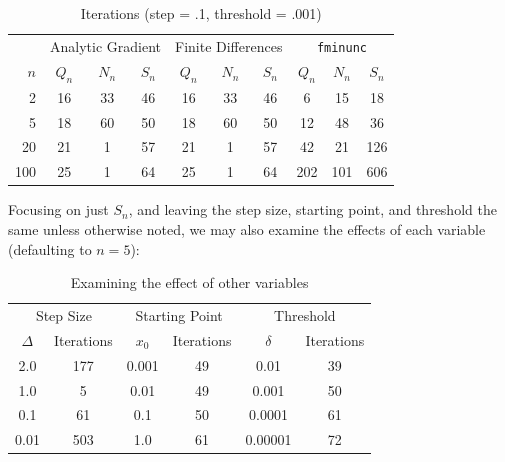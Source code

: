 \documentclass[10pt,letterpaper]{article}
\begin{document}
\begin{table}[h]
\centering
\caption{Iterations (step = .1, threshold = .001)}
\begin{tabular}{r|ccc|ccc|ccc}
   & \multicolumn{3}{|c}{Analytic Gradient} & \multicolumn{3}{|c}{Finite Differences} & \multicolumn{3}{|c}{\texttt{fminunc}} \\
$n$& $Q_n$         & $N_n$        & $S_n$   & $Q_n$              & $N_n$   & $S_n$           & $Q_n$         & $N_n$        & $S_n$ \\\hline
2  & 16            & 33           & 46      & 16                 & 33      & 46              & 6             & 15           & 18    \\
5  & 18            & 60           & 50      & 18                 & 60      & 50              & 12            & 48           & 36    \\
20 & 21            &  1           & 57      & 21                 &  1      & 57              & 42            & 21           & 126   \\
100& 25            &  1           & 64      & 25                 &  1      & 64              & 202           & 101          & 606   
\end{tabular}
\end{table}

Focusing on just $S_n$, and leaving the step size, starting point, and threshold the same unless otherwise noted, we may also examine the effects of each variable (defaulting to $n=5$):

\begin{table}[h]
\centering
\caption{Examining the effect of other variables}
\begin{tabular}{cc|cc|cc}
\multicolumn{2}{c}{Step Size}& \multicolumn{2}{|c}{Starting Point} & \multicolumn{2}{|c}{Threshold} \\
$\Delta$  & Iterations        & $x_0$   & Iterations   & $\delta$  & Iterations     \\\hline
2.0       & 177               & 0.001   & 49           & 0.01      & 39     \\
1.0       & 5                 & 0.01    & 49           & 0.001     & 50     \\
0.1       & 61                & 0.1     & 50           & 0.0001    & 61     \\
0.01      & 503               & 1.0     & 61           & 0.00001   & 72  
\end{tabular}
\end{table}
\end{document}
